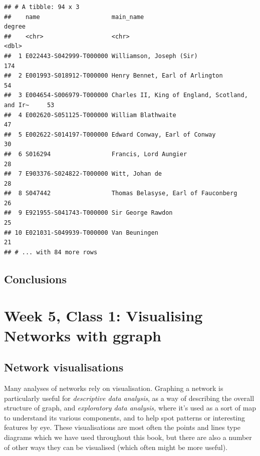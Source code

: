 \documentclass[
]{book}
\begin{document}
\begin{verbatim}
## # A tibble: 94 x 3
##    name                    main_name                                      degree
##    <chr>                   <chr>                                           <dbl>
##  1 E022443-S042999-T000000 Williamson, Joseph (Sir)                          174
##  2 E001993-S018912-T000000 Henry Bennet, Earl of Arlington                    54
##  3 E004654-S006979-T000000 Charles II, King of England, Scotland, and Ir~     53
##  4 E002620-S051125-T000000 William Blathwaite                                 47
##  5 E002622-S014197-T000000 Edward Conway, Earl of Conway                      30
##  6 S016294                 Francis, Lord Aungier                              28
##  7 E903376-S024822-T000000 Witt, Johan de                                     28
##  8 S047442                 Thomas Belasyse, Earl of Fauconberg                26
##  9 E921955-S041743-T000000 Sir George Rawdon                                  25
## 10 E021031-S049939-T000000 Van Beuningen                                      21
## # ... with 84 more rows
\end{verbatim}

\hypertarget{conclusions-1}{%
\section{Conclusions}\label{conclusions-1}}

\hypertarget{week-5-class-1-visualising-networks-with-ggraph}{%
\chapter{Week 5, Class 1: Visualising Networks with ggraph}\label{week-5-class-1-visualising-networks-with-ggraph}}

\hypertarget{network-visualisations}{%
\section{Network visualisations}\label{network-visualisations}}

Many analyses of networks rely on visualisation. Graphing a network is particularly useful for \emph{descriptive data analysis}, as a way of describing the overall structure of graph, and \emph{exploratory data analysis,} where it's used as a sort of map to understand its various components, and to help spot patterns or interesting features by eye. These visualisations are most often the points and lines type diagrams which we have used throughout this book, but there are also a number of other ways they can be visualised (which often might be more useful).
\end{document}
